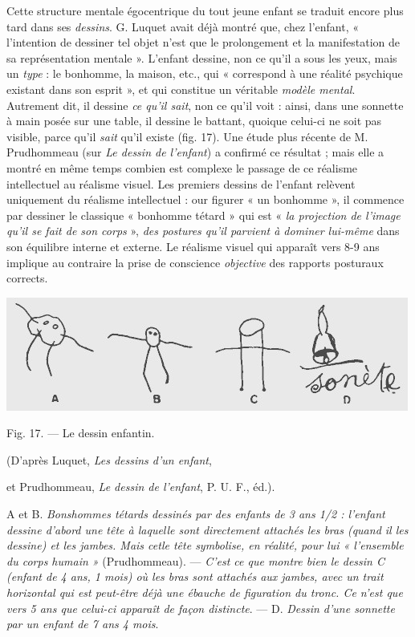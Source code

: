 \vspace{0.24cm}
{\footnotesize 
Cette structure mentale égocentrique du tout jeune enfant se traduit
encore plus tard dans ses {\it dessins}. G. Luquet avait déjà montré que, chez
l’enfant, « l'intention de dessiner tel objet n’est que le prolongement et la
manifestation de sa représentation mentale ». L'enfant dessine, non ce qu’il
a sous les yeux, mais un {\it type} : le bonhomme, la maison, etc., qui « correspond
à une réalité psychique existant dans son esprit », et qui constitue un
véritable {\it modèle mental}. Autrement dit, il dessine {\it ce qu’il sait}, non ce qu'il
voit : ainsi, dans une sonnette à main posée sur une table, il dessine le
battant, quoique celui-ci ne soit pas visible, parce qu'il {\it sait} qu'il existe
(fig. 17). Une étude plus récente de M. Prudhommeau (sur {\it Le dessin de
l'enfant}) a confirmé ce résultat ; mais elle a montré en même temps combien
est complexe le passage de ce réalisme intellectuel au réalisme visuel.
Les premiers dessins de l'enfant relèvent uniquement du réalisme intellectuel : 
our figurer « un bonhomme », il commence par dessiner le classique
« bonhomme tétard » qui est « {\it la projection de l’image qu'il se fait de son
corps} », {\it des postures qu’il parvient à dominer lui-même} dans son équilibre
interne et externe. Le réalisme visuel qui apparaît vers 8-9 ans implique au
contraire la prise de conscience {\it objective} des rapports posturaux corrects.

\begin{center}
\includegraphics[scale=0.9]{./05_sensible/017}

Fig. 17. — Le dessin enfantin.

(D’après Luquet, {\it Les dessins d'un enfant},

et Prudhommeau, {\it Le dessin de l'enfant}, P. U. F., éd.).
\end{center}

A et B. {\it Bonshommes tétards dessinés par des enfants de 3 ans 1/2 : l'enfant dessine d’abord
une tête à laquelle sont directement attachés les bras (quand il les dessine) et les jambes.
Mais cetle tête symbolise, en réalité, pour lui « l'ensemble du corps humain »} (Prudhommeau).
— {\it C'est ce que montre bien le dessin C (enfant de 4 ans, 1 mois) où les bras sont
attachés aux jambes, avec un trait horizontal qui est peut-être déjà une ébauche de figuration
du tronc. Ce n'est que vers 5 ans que celui-ci apparaît de façon distincte}. — D. {\it Dessin
d'une sonnette par un enfant de 7 ans 4 mois}.}
\vspace{0.31cm}

